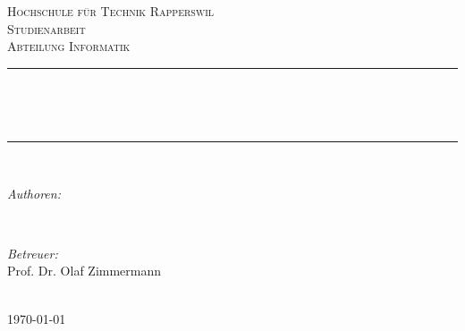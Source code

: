 \begin{titlepage}

\newcommand{\HRule}{\rule{\linewidth}{0.5mm}} %

\center %


\textsc{\LARGE Hochschule für Technik Rapperswil }\\[1.5cm] %
\textsc{\Large Studienarbeit}\\[0.5cm] %
\textsc{\large Abteilung Informatik}\\[0.5cm] %


\makeatletter
\HRule \\[0.4cm]
\begin{doublespacing}
{ \huge \textbf{\@title}}\\[0.2cm] %
\end{doublespacing}
\HRule \\[1.5cm]
 

\begin{minipage}{0.45\textwidth}
\begin{flushleft} \large
\emph{Authoren:}\\
\@author
\end{flushleft}
\end{minipage}
~
\begin{minipage}{0.45\textwidth}
\begin{flushright} \large
\emph{Betreuer:} \\
Prof. Dr. Olaf Zimmermann \\[1.2em] %
\end{flushright}
\end{minipage}\\[2cm]


{\large \today}\\[2cm] %

\vfill %

\end{titlepage}